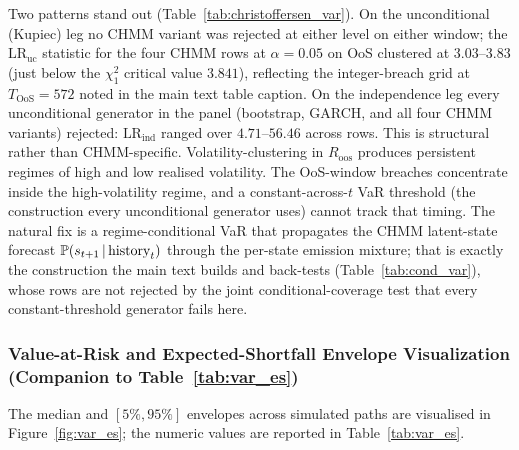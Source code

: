 Two patterns stand out (Table~\ref{tab:christoffersen_var}). On the unconditional (Kupiec) leg no CHMM variant was rejected at either level on either window; the $\text{LR}_{\text{uc}}$ statistic for the four CHMM rows at $\alpha = 0.05$ on OoS clustered at $3.03$--$3.83$ (just below the $\chi^2_1$ critical value $3.841$), reflecting the integer-breach grid at $T_{\text{OoS}} = 572$ noted in the main text table caption. On the independence leg every unconditional generator in the panel (bootstrap, GARCH, and all four CHMM variants) rejected: $\text{LR}_{\text{ind}}$ ranged over $4.71$--$56.46$ across rows. This is structural rather than CHMM-specific. Volatility-clustering in $R_{\text{oos}}$ produces persistent regimes of high and low realised volatility. The OoS-window breaches concentrate inside the high-volatility regime, and a constant-across-$t$ VaR threshold (the construction every unconditional generator uses) cannot track that timing. The natural fix is a regime-conditional VaR that propagates the CHMM latent-state forecast $\mathbb{P}(s_{t+1}\,|\,\text{history}_t)$ through the per-state emission mixture; that is exactly the construction the main text builds and back-tests (Table~\ref{tab:cond_var}), whose rows are not rejected by the joint conditional-coverage test that every constant-threshold generator fails here.

\subsubsection{Value-at-Risk and Expected-Shortfall Envelope Visualization (Companion to Table~\ref{tab:var_es})}
\label{sec:var_es_supp}

The median and $[5\%, 95\%]$ envelopes across simulated paths are visualised in Figure~\ref{fig:var_es}; the numeric values are reported in Table~\ref{tab:var_es}.

